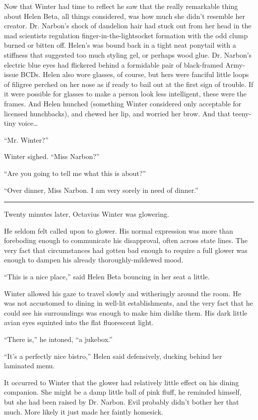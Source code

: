 \documentclass[ebook,10pt]{memoir}
\begin{document}
Now that Winter had time to reflect he saw that the really remarkable
thing about Helen Beta, all things considered, was how much she didn't
resemble her creator. Dr. Narbon's shock of dandelion hair had stuck
out from her head in the mad scientists regulation
finger-in-the-lightsocket formation with the odd clump burned or
bitten off. Helen's was bound back in a tight neat ponytail with a
stiffness that suggested too much styling gel, or perhaps wood
glue. Dr. Narbon's electric blue eyes had flickered behind a
formidable pair of black-framed Army-issue BCDs. Helen also wore
glasses, of course, but hers were fanciful little loops of filigree
perched on her nose as if ready to bail out at the first sign of
trouble. If it were possible for glasses to make a person look less
intelligent, these were the frames. And Helen hunched (something
Winter considered only acceptable for licensed hunchbacks), and chewed
her lip, and worried her brow. And that teeny-tiny voice\ldots

``Mr. Winter?''

Winter sighed. ``Miss Narbon?''

``Are you going to tell me what this is about?''

``Over dinner, Miss Narbon. I am very sorely in need of dinner.''

\pfbreak

Twenty minutes later, Octavius Winter was glowering. 

He seldom felt called upon to glower. His normal expression was more
than foreboding enough to communicate his disapproval, often across
state lines. The very fact that circumstances had gotten bad enough to
require a full glower was enough to dampen his already
thoroughly-mildewed mood.

``This is a nice place,'' said Helen Beta bouncing in her seat a little.

Winter allowed his gaze to travel slowly and witheringly around the
room. He was not accustomed to dining in well-lit establishments, and
the very fact that he could see his surroundings was enough to make
him dislike them. His dark little avian eyes squinted into the flat
fluorescent light.

``There is,'' he intoned, ``a jukebox.''

``It's a perfectly nice bistro,'' Helen said defensively, ducking
behind her laminated menu.

It occurred to Winter that the glower had relatively little effect on
his dining companion. She might be a damp little ball of pink fluff,
he reminded himself, but she had been raised by Dr. Narbon. Evil
probably didn't bother her that much. More likely it just made her
faintly homesick.
\end{document}
